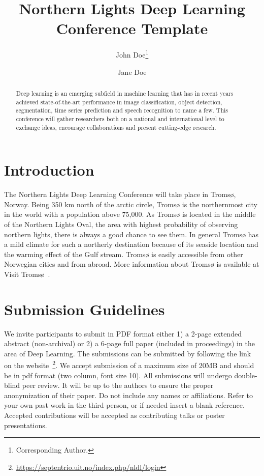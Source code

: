 \documentclass[fullpaper]{nldl}
\title{Northern Lights Deep Learning Conference Template}
\author[1]{John Doe\thanks{Corresponding Author.}}
\author[1,2]{Jane Doe}
\affil[1]{Affiliation 1}
\affil[2]{Affiliation 2}
\affil[ ]{\texttt{\{john.doe, jane.doe\}@affiliation.com}}
\begin{document}
\maketitle

\begin{abstract}
Deep learning is an emerging subfield in machine learning that has in recent years achieved state-of-the-art performance in image classification, object detection, segmentation, time series prediction and speech recognition to name a few.
This conference will gather researchers both on a national and international level to exchange ideas, encourage collaborations and present cutting-edge research.
\end{abstract}

\section{Introduction}
The Northern Lights Deep Learning Conference will take place in Troms{\o}, Norway.
Being 350 km north of the arctic circle, Troms{\o} is the northernmost city in the world with a population above 75,000.
As Troms{\o} is located in the middle of the Northern Lights Oval, the area with highest probability of observing northern lights, there is always a good chance to see them.
In general Troms{\o} has a mild climate for such a northerly destination because of its seaside location and the warming effect of the Gulf stream.
Troms{\o} is easily accessible from other Norwegian cities and from abroad.
More information about Troms{\o} is available at Visit Troms{\o}~\cite{tromso}.

\section{Submission Guidelines}
We invite participants to submit in PDF format either 1) a 2-page extended abstract (non-archival) or 2) a 6-page full paper (included in proceedings) in the area of Deep Learning.
The submissions can be submitted by following the link on the website~\footnote{\url{https://septentrio.uit.no/index.php/nldl/login}}. We accept submission of a maximum size of 20MB and should be in pdf format (two column, font size 10). All submissions will undergo double-blind peer review. It will be up to the authors to ensure the proper anonymization of their paper. Do not include any names or affiliations. Refer to your own past work in the third-person, or if needed insert a blank reference. Accepted contributions will be accepted as contributing talks or poster presentations.
\end{document}
